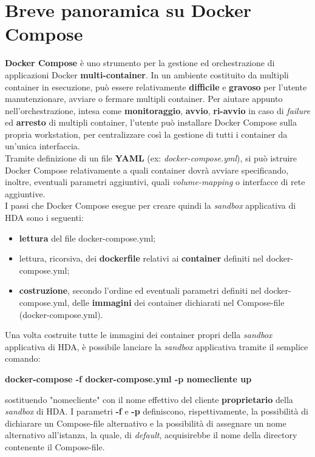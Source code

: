 \section{Breve panoramica su Docker Compose}
\textbf{Docker Compose} è uno strumento per la gestione ed orchestrazione di applicazioni Docker \textbf{multi-container}. In un ambiente costituito da multipli container in esecuzione, può essere relativamente \textbf{difficile} e \textbf{gravoso} per l'utente manutenzionare, avviare o fermare multipli container. Per aiutare appunto nell'orchestrazione, intesa come \textbf{monitoraggio}, \textbf{avvio}, \textbf{ri-avvio} in caso di \textit{failure} ed \textbf{arresto} di multipli container, l'utente può installare Docker Compose sulla propria workstation, per centralizzare così la gestione di tutti i container da un'unica interfaccia.\\
Tramite definizione di un file \textbf{YAML} (ex: \textit{docker-compose.yml}), si può istruire Docker Compose relativamente a quali container dovrà avviare specificando, inoltre, eventuali parametri aggiuntivi, quali \textit{volume-mapping} o interfacce di rete aggiuntive.\\
I passi che Docker Compose esegue per creare quindi la \textit{sandbox} applicativa di HDA sono i seguenti:
\begin{itemize}
	\item \textbf{lettura} del file docker-compose.yml;
	\item lettura, ricorsiva, dei \textbf{dockerfile} relativi ai \textbf{container} definiti nel docker-compose.yml;
	\item \textbf{costruzione}, secondo l'ordine ed eventuali parametri definiti nel docker-compose.yml, delle \textbf{immagini} dei container dichiarati nel Compose-file (docker-compose.yml).
\end{itemize}
Una volta costruite tutte le immagini dei container propri della \textit{sandbox} applicativa di HDA, è possibile lanciare la \textit{sandbox} applicativa tramite il semplice comando: \centerline{\textbf{docker-compose
-f docker-compose.yml -p nomecliente up}} sostituendo "nomecliente" con il nome effettivo del cliente \textbf{proprietario} della \textit{sandbox} di HDA. I parametri \textbf{-f} e \textbf{-p} definiscono, rispettivamente, la possibilità di dichiarare un Compose-file alternativo e la possibilità di assegnare un nome alternativo all'istanza, la quale, di \textit{default}, acquisirebbe il nome della directory contenente il Compose-file.

